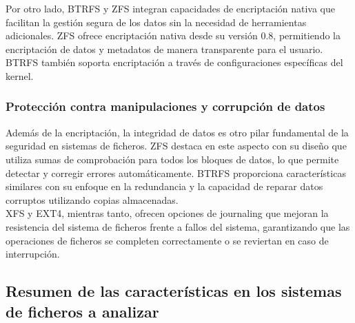Por otro lado, BTRFS y ZFS integran capacidades de encriptación nativa que facilitan la gestión segura de los datos sin la necesidad de herramientas adicionales. ZFS ofrece encriptación nativa desde su versión 0.8, permitiendo la encriptación de datos y metadatos de manera transparente para el usuario. BTRFS también soporta encriptación a través de configuraciones específicas del kernel.

\subsubsection{Protección contra manipulaciones y corrupción de datos}

Además de la encriptación, la integridad de datos es otro pilar fundamental de la seguridad en sistemas de ficheros. ZFS destaca en este aspecto con su diseño que utiliza sumas de comprobación para todos los bloques de datos, lo que permite detectar y corregir errores automáticamente. BTRFS proporciona características similares con su enfoque en la redundancia y la capacidad de reparar datos corruptos utilizando copias almacenadas.\\

XFS y EXT4, mientras tanto, ofrecen opciones de journaling que mejoran la resistencia del sistema de ficheros frente a fallos del sistema, garantizando que las operaciones de ficheros se completen correctamente o se reviertan en caso de interrupción.

\subsection{Resumen de las características en los sistemas de ficheros a analizar}

